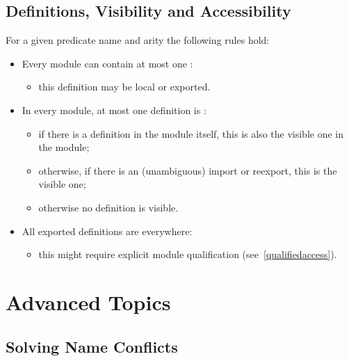 \subsection{Definitions, Visibility and Accessibility}

For a given predicate name and arity the following rules hold:

\begin{itemize}
\item Every module can contain at most one :
    \begin{itemize}
    \item this definition may be local or exported.
    \end{itemize}
\item In every module, at most one definition is
  :
    \begin{itemize}
    \item if there is a definition in the module itself,
	this is also the visible one in the module;
    \item otherwise, if there is an (unambiguous) import or reexport,
	this is the visible one;
    \item otherwise no definition is visible.
    \end{itemize}
\item All exported definitions are
  everywhere:
    \begin{itemize}
    \item this might require explicit module qualification
	(see~\ref{qualifiedaccess}).
    \end{itemize}
\end{itemize}


\section{Advanced Topics}
\subsection{Solving Name Conflicts}

